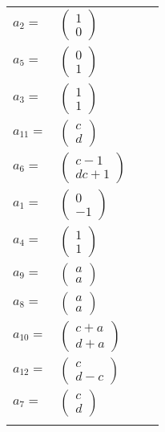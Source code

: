\documentclass[1p]{elsarticle_modified}
\theoremstyle{definition}
\begin{document}
\begin{tabular}{m{7pt} m{180pt} m{7pt} m{180pt} }
\flushright $a_{2}=$&$\begin{pmatrix}1\\0\end{pmatrix}$ \\
\flushright $a_{5}=$&$\begin{pmatrix}0\\1\end{pmatrix}$ \\
\flushright $a_{3}=$&$\begin{pmatrix}1\\1\end{pmatrix}$ \\
\flushright $a_{11}=$&$\begin{pmatrix}c\\d\end{pmatrix}$ \\
\flushright $a_{6}=$&$\begin{pmatrix}c-1\\d c+1\end{pmatrix}$ \\
\flushright $a_{1}=$&$\begin{pmatrix}0\\-1\end{pmatrix}$ \\
\flushright $a_{4}=$&$\begin{pmatrix}1\\1\end{pmatrix}$ \\
\flushright $a_{9}=$&$\begin{pmatrix}a\\a\end{pmatrix}$ \\
\flushright $a_{8}=$&$\begin{pmatrix}a\\a\end{pmatrix}$ \\
\flushright $a_{10}=$&$\begin{pmatrix}c+a\\d+a\end{pmatrix}$ \\
\flushright $a_{12}=$&$\begin{pmatrix}c\\d- c\end{pmatrix}$ \\
\flushright $a_{7}=$&$\begin{pmatrix}c\\d\end{pmatrix}$\\&\end{tabular}
\end{document}
